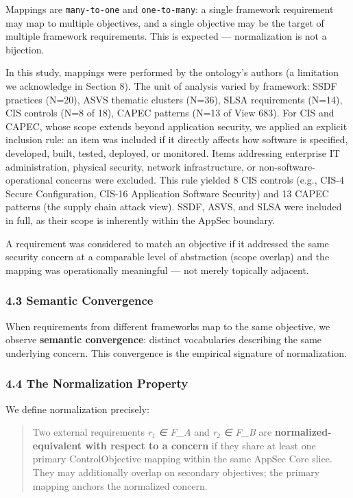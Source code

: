 \documentclass[
]{article}
\begin{document}
Mappings are \texttt{many-to-one} and \texttt{one-to-many}: a single
framework requirement may map to multiple objectives, and a single
objective may be the target of multiple framework requirements. This is
expected --- normalization is not a bijection.

In this study, mappings were performed by the ontology's authors (a
limitation we acknowledge in Section 8). The unit of analysis varied by
framework: SSDF practices (N=20), ASVS thematic clusters (N=36), SLSA
requirements (N=14), CIS controls (N=8 of 18), CAPEC patterns (N=13 of
View 683). For CIS and CAPEC, whose scope extends beyond application
security, we applied an explicit inclusion rule: an item was included if
it directly affects how software is specified, developed, built, tested,
deployed, or monitored. Items addressing enterprise IT administration,
physical security, network infrastructure, or non-software-operational
concerns were excluded. This rule yielded 8 CIS controls (e.g., CIS-4
Secure Configuration, CIS-16 Application Software Security) and 13 CAPEC
patterns (the supply chain attack view). SSDF, ASVS, and SLSA were
included in full, as their scope is inherently within the AppSec
boundary.

A requirement was considered to match an objective if it addressed the
same security concern at a comparable level of abstraction (scope
overlap) and the mapping was operationally meaningful --- not merely
topically adjacent.

\subsubsection{4.3 Semantic Convergence}\label{semantic-convergence}

When requirements from different frameworks map to the same objective,
we observe \textbf{semantic convergence}: distinct vocabularies
describing the same underlying concern. This convergence is the
empirical signature of normalization.

\subsubsection{4.4 The Normalization
Property}\label{the-normalization-property}

We define normalization precisely:

\begin{quote}
Two external requirements \emph{r₁ ∈ F\_A} and \emph{r₂ ∈ F\_B} are
\textbf{normalized-equivalent with respect to a concern} if they share
at least one primary ControlObjective mapping within the same AppSec
Core slice. They may additionally overlap on secondary objectives; the
primary mapping anchors the normalized concern.
\end{quote}
\end{document}
